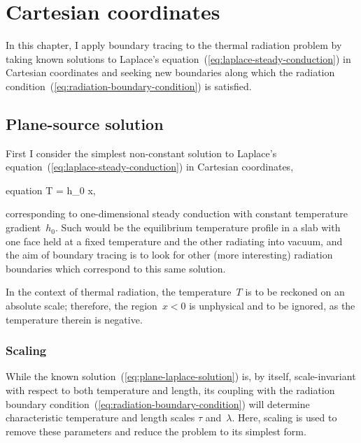 \chapter{Cartesian coordinates}
\label{ch:cartesian}

In this chapter,
I apply boundary tracing to the thermal radiation problem
by taking known solutions
to Laplace's equation~(\ref{eq:laplace-steady-conduction})
in Cartesian coordinates
and seeking new boundaries along which
the radiation condition~(\ref{eq:radiation-boundary-condition})
is satisfied.

\section{Plane-source solution}
\label{sec:cartesian.plane}

First I consider the simplest non-constant solution
to Laplace's equation~(\ref{eq:laplace-steady-conduction})
in Cartesian coordinates,
\begin{important}{equation}
  T = h_0 x,
  \label{eq:plane-laplace-solution}
\end{important}
corresponding to one-dimensional steady conduction
with constant temperature gradient~$h_0$.
Such would be the equilibrium temperature profile in a slab
with one face held at a fixed temperature
and the other radiating into vacuum,
and the aim of boundary tracing
is to look for other (more interesting) radiation boundaries
which correspond to this same solution.

In the context of thermal radiation,
the temperature~$T$ is to be reckoned on an absolute scale;
therefore, the region~$x < 0$ is unphysical and to be ignored,
as the temperature therein is negative.

\subsection{Scaling}
\label{sec:cartesian.plane.scaling}

While the known solution~(\ref{eq:plane-laplace-solution}) is, by itself,
scale-invariant with respect to both temperature and length,
its coupling with
the radiation boundary condition~(\ref{eq:radiation-boundary-condition})
will determine characteristic temperature and length scales
$\tau$ and~$\lambda$.
Here, scaling is used to remove these parameters
and reduce the problem to its simplest form.

